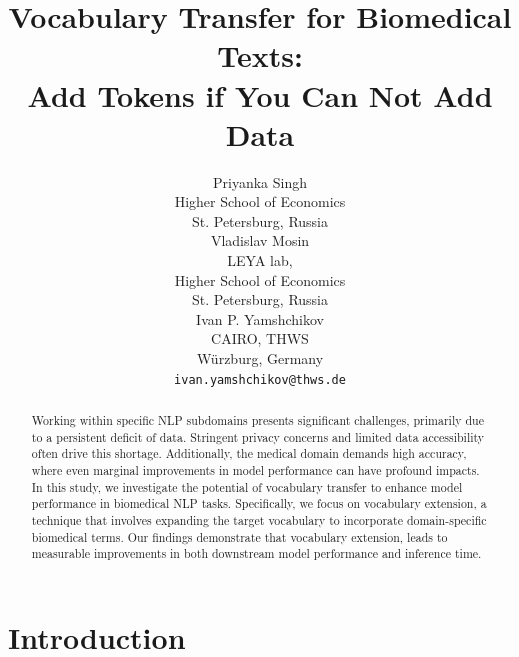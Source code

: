 \documentclass[11pt]{article}
\title{Vocabulary Transfer for Biomedical Texts: \\
Add Tokens if You Can Not Add Data}
\author{Priyanka Singh \\
Higher School of Economics\\
St. Petersburg, Russia\\
\And
Vladislav Mosin\\
LEYA lab,\\
Higher School of Economics\\
St. Petersburg, Russia\\
\And
Ivan P. Yamshchikov\\
CAIRO, THWS\\
W\"{u}rzburg, Germany\\
\texttt{ivan.yamshchikov@thws.de}
}
\begin{document}
\maketitle
\begin{abstract}

Working within specific NLP subdomains presents significant challenges, primarily due to a persistent deficit of data. Stringent privacy concerns and limited data accessibility often drive this shortage. Additionally, the medical domain demands high accuracy, where even marginal improvements in model performance can have profound impacts. In this study, we investigate the potential of vocabulary transfer to enhance model performance in biomedical NLP tasks. Specifically, we focus on vocabulary extension, a technique that involves expanding the target vocabulary to incorporate domain-specific biomedical terms. Our findings demonstrate that vocabulary extension, leads to measurable improvements in both downstream model performance and inference time.



\end{abstract}
\section{Introduction}
\end{document}
